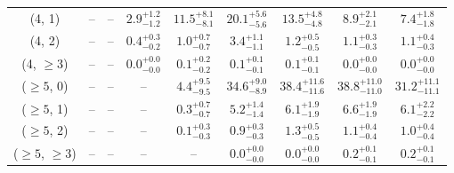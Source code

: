 \begin{table}[h!]
{\begin{tabular}{ccccccccc}
	(4, 1) & -- & -- & $2.9^{+ 1.2 }_{- 1.2 }$ & $11.5^{+ 8.1 }_{- 8.1 }$ & $20.1^{+ 5.6 }_{- 5.6 }$ & $13.5^{+ 4.8 }_{- 4.8 }$ & $8.9^{+ 2.1 }_{- 2.1 }$ & $7.4^{+ 1.8 }_{- 1.8 }$ \\[0.5ex] 
	(4, 2) & -- & -- & $0.4^{+ 0.3 }_{- 0.2 }$ & $1.0^{+ 0.7 }_{- 0.7 }$ & $3.4^{+ 1.1 }_{- 1.1 }$ & $1.2^{+ 0.5 }_{- 0.5 }$ & $1.1^{+ 0.3 }_{- 0.3 }$ & $1.1^{+ 0.4 }_{- 0.3 }$ \\[0.5ex] 
	(4, $\ge3$) & -- & -- & $0.0^{+ 0.0 }_{- 0.0 }$ & $0.1^{+ 0.2 }_{- 0.2 }$ & $0.1^{+ 0.1 }_{- 0.1 }$ & $0.1^{+ 0.1 }_{- 0.1 }$ & $0.0^{+ 0.0 }_{- 0.0 }$ & $0.0^{+ 0.0 }_{- 0.0 }$ \\[0.5ex] 
	($\ge5$, 0) & -- & -- & -- & $4.4^{+ 9.5 }_{- 9.5 }$ & $34.6^{+ 9.0 }_{- 8.9 }$ & $38.4^{+ 11.6 }_{- 11.6 }$ & $38.8^{+ 11.0 }_{- 11.0 }$ & $31.2^{+ 11.1 }_{- 11.1 }$ \\[0.5ex] 
	($\ge5$, 1) & -- & -- & -- & $0.3^{+ 0.7 }_{- 0.7 }$ & $5.2^{+ 1.4 }_{- 1.4 }$ & $6.1^{+ 1.9 }_{- 1.9 }$ & $6.6^{+ 1.9 }_{- 1.9 }$ & $6.1^{+ 2.2 }_{- 2.2 }$ \\[0.5ex] 
	($\ge5$, 2) & -- & -- & -- & $0.1^{+ 0.3 }_{- 0.3 }$ & $0.9^{+ 0.3 }_{- 0.3 }$ & $1.3^{+ 0.5 }_{- 0.5 }$ & $1.1^{+ 0.4 }_{- 0.4 }$ & $1.0^{+ 0.4 }_{- 0.4 }$ \\[0.5ex] 
	($\ge5$, $\ge3$) & -- & -- & -- & -- & $0.0^{+ 0.0 }_{- 0.0 }$ & $0.0^{+ 0.0 }_{- 0.0 }$ & $0.2^{+ 0.1 }_{- 0.1 }$ & $0.2^{+ 0.1 }_{- 0.1 }$ \\[0.5ex] 
	\hline
	\hline
\end{tabular}}
\end{table}
